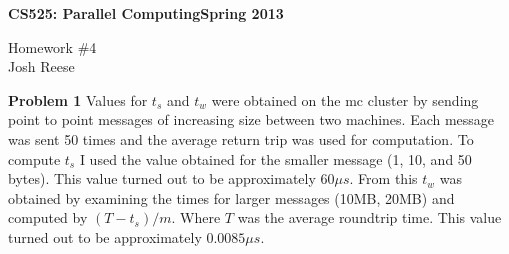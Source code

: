 \documentclass[11pt]{article}
\begin{document}
 \thispagestyle{empty}

 \noindent \textbf{CS525: Parallel Computing\hspace*{\fill}Spring 2013} 
 \begin{center}
   {\LARGE Homework \#4\\\small Josh Reese}\\
 \end{center}
 {\bf Problem 1} Values for $t_s$ and $t_w$ were obtained on the mc
 cluster by sending point to point messages of increasing size between
 two machines. Each
 message was sent 50 times and the average return trip was used for
 computation. To compute $t_s$ I used the value obtained for the
 smaller message (1, 10, and 50 bytes). This value turned out to be
 approximately $60\mu s$. From this $t_w$ was obtained by examining
 the times for larger messages (10MB, 20MB) and computed by
 $(T-t_s)/m$. Where $T$ was the average roundtrip time. This value
 turned out to be approximately $0.0085\mu s$.\\
\end{document}
